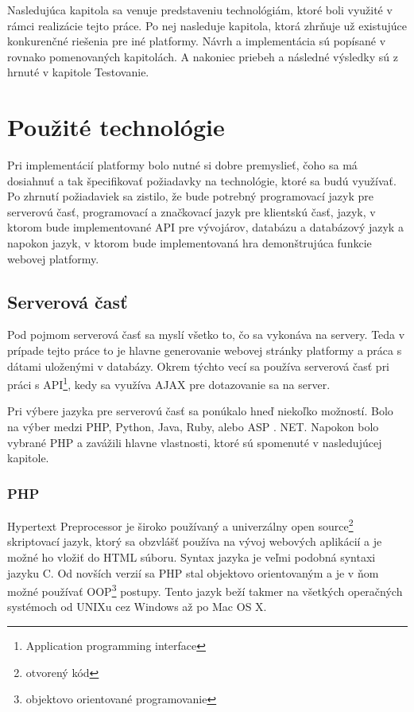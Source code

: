 Nasledujúca kapitola sa venuje predstaveniu technológiám, ktoré boli využité v rámci realizácie tejto práce. Po nej nasleduje kapitola, ktorá zhrňuje už existujúce konkurenčné riešenia pre iné platformy. Návrh a implementácia sú popísané v rovnako pomenovaných kapitolách. A nakoniec priebeh a následné výsledky sú z hrnuté v kapitole Testovanie.

\chapter{Použité technológie}
\label{chap:technologie}
Pri implementácií platformy bolo nutné si dobre premyslieť, čoho sa má dosiahnuť a tak špecifikovať požiadavky na technológie, ktoré sa budú využívať. Po zhrnutí požiadaviek sa zistilo, že bude potrebný programovací jazyk pre serverovú časť, programovací a značkovací jazyk pre klientskú časť, jazyk, v ktorom bude implementované API pre vývojárov, databázu a databázový jazyk a napokon jazyk, v ktorom bude implementovaná hra demonštrujúca funkcie webovej platformy.

\section{Serverová časť}
\label{sec:server}
Pod pojmom serverová časť sa myslí všetko to, čo sa vykonáva na servery. Teda v prípade tejto práce to je hlavne generovanie webovej stránky platformy a práca s dátami uloženými v databázy. Okrem týchto vecí sa používa serverová časť pri práci s API\footnote{Application programming interface}, kedy sa využíva AJAX pre dotazovanie sa na server.

Pri výbere jazyka pre serverovú časť sa ponúkalo hneď niekoľko možností. Bolo na výber medzi PHP, Python, Java, Ruby, alebo ASP . NET. Napokon bolo vybrané PHP a zavážili hlavne vlastnosti, ktoré sú spomenuté v nasledujúcej kapitole.

\subsection{PHP}
\label{sec:php}
Hypertext Preprocessor je široko používaný a univerzálny open source\footnote{otvorený kód} skriptovací jazyk, ktorý sa obzvlášť používa na vývoj webových aplikácií a je možné ho vložiť do HTML súboru. Syntax jazyka je veľmi podobná syntaxi jazyku C. Od novších verzií sa PHP stal objektovo orientovaným a je v ňom možné používať OOP\footnote{objektovo orientované programovanie} postupy. Tento jazyk beží takmer na všetkých operačných systémoch od UNIXu cez Windows až po Mac OS X.

